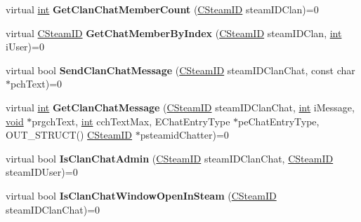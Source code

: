 \begin{DoxyCompactItemize}
\item 
\hypertarget{classISteamFriends_a424c2a4680fab3b327523cde6895a57c}{}virtual \hyperlink{SDL__thread_8h_a6a64f9be4433e4de6e2f2f548cf3c08e}{int} {\bfseries Get\+Clan\+Chat\+Member\+Count} (\hyperlink{classCSteamID}{C\+Steam\+I\+D} steam\+I\+D\+Clan)=0\label{classISteamFriends_a424c2a4680fab3b327523cde6895a57c}

\item 
\hypertarget{classISteamFriends_a840cbfc191ba1d174b6dfae497b3251b}{}virtual \hyperlink{classCSteamID}{C\+Steam\+I\+D} {\bfseries Get\+Chat\+Member\+By\+Index} (\hyperlink{classCSteamID}{C\+Steam\+I\+D} steam\+I\+D\+Clan, \hyperlink{SDL__thread_8h_a6a64f9be4433e4de6e2f2f548cf3c08e}{int} i\+User)=0\label{classISteamFriends_a840cbfc191ba1d174b6dfae497b3251b}

\item 
\hypertarget{classISteamFriends_ac66f8ad646a2b5cc58fe90ba8c3ba021}{}virtual bool {\bfseries Send\+Clan\+Chat\+Message} (\hyperlink{classCSteamID}{C\+Steam\+I\+D} steam\+I\+D\+Clan\+Chat, const char $\ast$pch\+Text)=0\label{classISteamFriends_ac66f8ad646a2b5cc58fe90ba8c3ba021}

\item 
\hypertarget{classISteamFriends_a64a3d35df1e2ede7844e21957b6984cd}{}virtual \hyperlink{SDL__thread_8h_a6a64f9be4433e4de6e2f2f548cf3c08e}{int} {\bfseries Get\+Clan\+Chat\+Message} (\hyperlink{classCSteamID}{C\+Steam\+I\+D} steam\+I\+D\+Clan\+Chat, \hyperlink{SDL__thread_8h_a6a64f9be4433e4de6e2f2f548cf3c08e}{int} i\+Message, \hyperlink{SDL__audio_8h_a52835ae37c4bb905b903cbaf5d04b05f}{void} $\ast$prgch\+Text, \hyperlink{SDL__thread_8h_a6a64f9be4433e4de6e2f2f548cf3c08e}{int} cch\+Text\+Max, E\+Chat\+Entry\+Type $\ast$pe\+Chat\+Entry\+Type, O\+U\+T\+\_\+\+S\+T\+R\+U\+C\+T() \hyperlink{classCSteamID}{C\+Steam\+I\+D} $\ast$psteamid\+Chatter)=0\label{classISteamFriends_a64a3d35df1e2ede7844e21957b6984cd}

\item 
\hypertarget{classISteamFriends_a6256d1c58f3fd7e1600bf900faf43593}{}virtual bool {\bfseries Is\+Clan\+Chat\+Admin} (\hyperlink{classCSteamID}{C\+Steam\+I\+D} steam\+I\+D\+Clan\+Chat, \hyperlink{classCSteamID}{C\+Steam\+I\+D} steam\+I\+D\+User)=0\label{classISteamFriends_a6256d1c58f3fd7e1600bf900faf43593}

\item 
\hypertarget{classISteamFriends_a782a7437f023b4b154d40e52679e977c}{}virtual bool {\bfseries Is\+Clan\+Chat\+Window\+Open\+In\+Steam} (\hyperlink{classCSteamID}{C\+Steam\+I\+D} steam\+I\+D\+Clan\+Chat)=0\label{classISteamFriends_a782a7437f023b4b154d40e52679e977c}


\end{DoxyCompactItemize}
